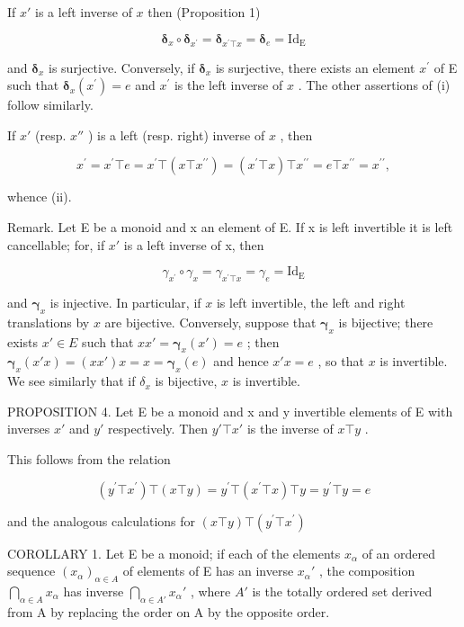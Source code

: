 If \(x'\) is a left inverse of \(x\) then (Proposition 1)

\[
\boldsymbol {\delta} _ {x} \circ \boldsymbol {\delta} _ {x ^ {\prime}} = \boldsymbol {\delta} _ {x ^ {\prime} \top x} = \boldsymbol {\delta} _ {e} = \mathrm{Id} _ {\mathrm{E}}
\]

and \(\pmb{\delta}_{x}\) is surjective. Conversely, if \(\pmb{\delta}_{x}\) is surjective, there exists an element \(x^{\prime}\) of E such that \(\pmb{\delta}_{x}(x^{\prime}) = e\) and \(x^{\prime}\) is the left inverse of \(x\) . The other assertions of (i) follow similarly.

If \(x'\) (resp. \(x''\) ) is a left (resp. right) inverse of \(x\) , then

\[
x ^ {\prime} = x ^ {\prime} \top e = x ^ {\prime} \top (x \top x ^ {\prime \prime}) = (x ^ {\prime} \top x) \top x ^ {\prime \prime} = e \top x ^ {\prime \prime} = x ^ {\prime \prime},
\]

whence (ii).

Remark. Let E be a monoid and x an element of E. If x is left invertible it is left cancellable; for, if \(x'\) is a left inverse of x, then

\[
\gamma_ {x ^ {\prime}} \circ \gamma_ {x} = \gamma_ {x ^ {\prime} \top x} = \gamma_ {e} = \mathrm{Id} _ {\mathrm{E}}
\]

and \(\pmb{\gamma}_{x}\) is injective. In particular, if \(x\) is left invertible, the left and right translations by \(x\) are bijective. Conversely, suppose that \(\pmb{\gamma}_{x}\) is bijective; there exists \(x' \in E\) such that \(xx' = \pmb{\gamma}_{x}(x') = e\) ; then \(\pmb{\gamma}_{x}(x' x) = (xx') x = x = \pmb{\gamma}_{x}(e)\) and hence \(x' x = e\) , so that \(x\) is invertible. We see similarly that if \(\delta_{x}\) is bijective, \(x\) is invertible.

PROPOSITION 4. Let E be a monoid and x and y invertible elements of E with inverses \(x'\) and \(y'\) respectively. Then \(y' \top x'\) is the inverse of \(x \top y\) .

This follows from the relation

\[
\left(y ^ {\prime} \top x ^ {\prime}\right) \top (x \top y) = y ^ {\prime} \top \left(x ^ {\prime} \top x\right) \top y = y ^ {\prime} \top y = e
\]

and the analogous calculations for \((x\top y)\top (y^{\prime}\top x^{\prime})\)

COROLLARY 1. Let E be a monoid; if each of the elements \(x_{\alpha}\) of an ordered sequence \((x_{\alpha})_{\alpha \in A}\) of elements of E has an inverse \(x_{\alpha}'\) , the composition \(\bigcap_{\alpha \in A} x_{\alpha}\) has inverse \(\bigcap_{\alpha \in A'} x_{\alpha}'\) , where \(A'\) is the totally ordered set derived from A by replacing the order on A by the opposite order.

